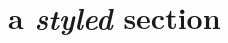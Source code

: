 \documentclass[aspectratio=169]{beamer}
\begin{document}
   
   \section{a \texorpdfstring{\itshape styled\upshape}{styled} section}
\end{document}
